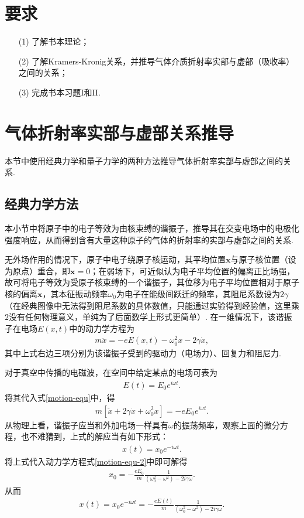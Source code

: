 \documentclass{assignment}
\begin{document}
\section*{要求}
\begin{itemize}
    \item[(1)] 了解书本理论；
    \item[(2)] 了解Kramers-Kronig关系，并推导气体介质折射率实部与虚部（吸收率）之间的关系；
    \item[(3)] 完成书本习题I和II.
\end{itemize}

\section{气体折射率实部与虚部关系推导}
本节中使用经典力学和量子力学的两种方法推导气体折射率实部与虚部之间的关系.

\subsection{经典力学方法}
本小节中将原子中的电子等效为由核束缚的谐振子，推导其在交变电场中的电极化强度响应，从而得到含有大量这种原子的气体的折射率的实部与虚部之间的关系.

无外场作用的情况下，原子中电子绕原子核运动，其平均位置$\bm{x}$与原子核位置（设为原点）重合，即$\bm{x}=0$；在弱场下，可近似认为电子平均位置的偏离正比场强，故可将电子等效为受原子核束缚的一个谐振子，其位移为电子平均位置相对于原子核的偏离$\bm{x}$，其本征振动频率$\omega_0$为电子在能级间跃迁的频率，其阻尼系数设为$2\gamma$（在经典图像中无法得到阻尼系数的具体数值，只能通过实验得到经验值，这里乘$2$没有任何物理意义，单纯为了后面数学上形式更简单）. 在一维情况下，该谐振子在电场$E(x,t)$中的动力学方程为
\begin{align}
    \label{motion-equ}
    m\ddot{x}=-eE(x,t)-\omega_0^2x-2\gamma\dot{x},
\end{align}
其中上式右边三项分别为该谐振子受到的驱动力（电场力）、回复力和阻尼力.

对于真空中传播的电磁波，在空间中给定某点的电场可表为
\begin{align}
    E(t)=E_0e^{i\omega t}.
\end{align}
将其代入式\eqref{motion-equ}中，得
\begin{align}
    \label{motion-equ-2}
    m[\ddot{x}+2\gamma\dot{x}+\omega_0^2x]=-eE_0e^{i\omega t}.
\end{align}
从物理上看，谐振子应当和外加电场一样具有$\omega$的振荡频率，观察上面的微分方程，也不难猜到，上式的解应当有如下形式：
\begin{align}
    \label{trial-sol}
    x(t)=x_0e^{-i\omega t}.
\end{align}
将上式代入动力学方程式\eqref{motion-equ-2}中即可解得
\begin{align}
    x_0=-\frac{eE_0}{m}\frac{1}{(\omega_0^2-\omega^2)-2i\gamma\omega}.
\end{align}
从而
\begin{align}
    x(t)=x_0e^{-i\omega t}=-\frac{eE(t)}{m}\frac{1}{(\omega_0^2-\omega^2)-2i\gamma\omega}.
\end{align}
\end{document}
